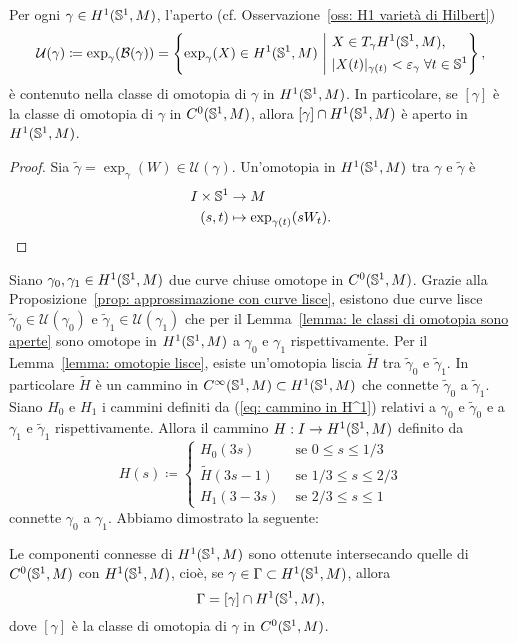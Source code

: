 \begin{lemma}\label{lemma: le classi di omotopia sono aperte}
	Per ogni \(\gamma\in H^1(\mathbb{S}^1,M)\), l'aperto (cf. Osservazione~\ref{oss: H1 varietà di Hilbert})
	\[
		\mathcal{U}(\gamma) \coloneq \exp_\gamma(\mathcal{B}(\gamma)) = \left\{\exp_\gamma(X) \in H^1(\Sp^1,M) \ \middle| \ 
		\begin{aligned}
			&X \in T_{\gamma}H^1(\Sp^1,M), \\
			&|X(t)|_{\gamma(t)} < \ve_\gamma \; \forall t \in \Sp^1
		\end{aligned}
		\right\},
	\]
	è contenuto nella classe di omotopia di \(\gamma\) in \(H^1(\mathbb{S}^1,M)\). In particolare, se \([\gamma]\) è la classe di omotopia di \(\gamma\) in \(C^0(\mathbb{S}^1,M)\), allora \([\gamma] \cap H^1(\mathbb{S}^1,M)\) è aperto in \(H^1(\mathbb{S}^1,M)\). 
\end{lemma}
\begin{proof}
	Sia \(\widetilde{\gamma}= \exp_\gamma(W) \in \mathcal{U}(\gamma)\). Un'omotopia in \(H^1(\mathbb{S}^1,M)\) tra \(\gamma\) e \(\widetilde{\gamma}\) è 
	\begin{align}\label{eq: cammino in H^1}
		I \times \mathbb{S}^1 &\to M \nonumber \\
		(s,t) &\mapsto \exp_{\gamma(t)}(sW_t). 
	\end{align}
\end{proof}

Siano \(\gamma_0,\gamma_1 \in H^1(\mathbb{S}^1,M)\) due curve chiuse omotope in \(C^0(\mathbb{S}^1,M)\). Grazie alla Proposizione~\ref{prop: approssimazione con curve lisce}, esistono due curve lisce \(\widetilde{\gamma}_0 \in \mathcal{U}(\gamma_0)\) e \(\widetilde{\gamma}_1 \in \mathcal{U}(\gamma_1)\) che per il Lemma~\ref{lemma: le classi di omotopia sono aperte} sono omotope in \(H^1(\mathbb{S}^1,M)\) a \(\gamma_0\) e \(\gamma_1\) rispettivamente. Per il Lemma~\ref{lemma: omotopie lisce}, esiste un'omotopia liscia \(\widetilde{H}\) tra \(\widetilde{\gamma}_0\) e \(\widetilde{\gamma}_1\). In particolare \(\widetilde{H}\) è un cammino in \(C^\infty(\mathbb{S}^1,M) \subset H^1(\mathbb{S}^1,M)\) che connette \(\widetilde{\gamma}_0\) a \(\widetilde{\gamma}_1\). Siano \(H_0\) e \(H_1\) i cammini definiti da (\ref{eq: cammino in H^1}) relativi a \(\gamma_0\) e \(\widetilde{\gamma}_0\) e a \(\gamma_1\) e \(\widetilde{\gamma}_1\) rispettivamente. Allora il cammino \(H:I \to H^1(\mathbb{S}^1,M)\) definito da 
\[
	H(s) \coloneq \begin{cases}
		H_0(3s) & \text{ se } 0 \leq s \leq 1/3 \\
		\widetilde{H}(3s-1) &\text{ se } 1/3 \leq s \leq 2/3 \\
		H_1(3-3s) & \text{ se } 2/3 \leq s \leq 1
	\end{cases}
\]
connette \(\gamma_0\) a \(\gamma_1\). Abbiamo dimostrato la seguente:
\begin{prop}
	Le componenti connesse di \(H^1(\mathbb{S}^1,M)\) sono ottenute intersecando quelle di \(C^0(\mathbb{S}^1,M)\) con \(H^1(\mathbb{S}^1,M)\), cioè, se \(\gamma \in \Gamma \subset H^1(\mathbb{S}^1,M)\), allora 
	\[
		\Gamma = [\gamma] \cap H^1(\mathbb{S}^1,M),
	\]
	dove \([\gamma]\) è la classe di omotopia di \(\gamma\) in \(C^0(\mathbb{S}^1,M)\).
\end{prop}

